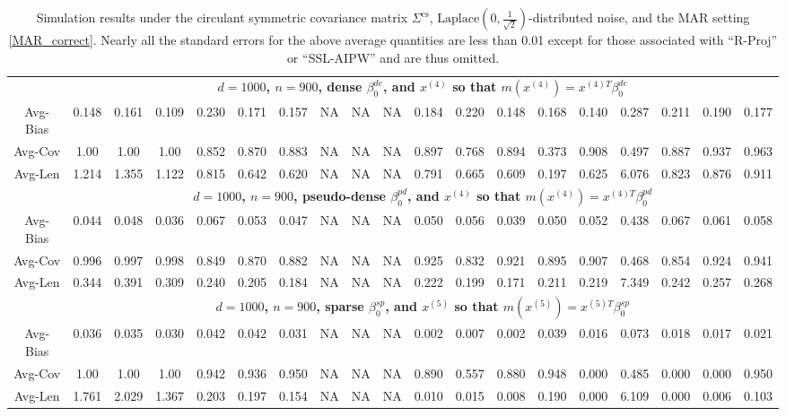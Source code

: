 \documentclass[ejsv2,noshowframe]{imsart}
\theoremstyle{plain}
\theoremstyle{definition}
\theoremstyle{remark}
\begin{document}
\begin{table}[hbtp!]
\begin{center}
{\begin{tabular}{ccccccccccccccccccc}
		& \multicolumn{18}{c}{\bf $d=1000$, $n = 900$, dense $\beta_0^{de}$, and $x^{(4)}$ so that $m(x^{(4)})=x^{(4)T}\beta_0^{de}$} \\ \cline{2-19}
		Avg-Bias & 0.148 & 0.161 & 0.109 & 0.230 & 0.171 & 0.157 & NA & NA & NA & 0.184 & 0.220 & 0.148 & 0.168 & 0.140 & 0.287 & 0.211 & 0.190 & 0.177 \\
		Avg-Cov & 1.00 & 1.00 & 1.00 & 0.852 & 0.870 & 0.883 & NA & NA & NA & 0.897 & 0.768 & 0.894 & 0.373 & 0.908 & 0.497 & 0.887 & 0.937 & 0.963 \\
		Avg-Len & 1.214 & 1.355 & 1.122 & 0.815 & 0.642 & 0.620 & NA & NA & NA & 0.791 & 0.665 & 0.609 & 0.197 & 0.625 & 6.076 & 0.823 & 0.876 & 0.911 \\
		\cline{2-19}
		
		& \multicolumn{18}{c}{\bf $d=1000$, $n = 900$, pseudo-dense $\beta_0^{pd}$, and $x^{(4)}$ so that $m(x^{(4)})=x^{(4)T}\beta_0^{pd}$} \\ \cline{2-19}
		Avg-Bias & 0.044 & 0.048 & 0.036 & 0.067 & 0.053 & 0.047 & NA & NA & NA & 0.050 & 0.056 & 0.039 & 0.050 & 0.052 & 0.438 & 0.067 & 0.061 & 0.058 \\
		Avg-Cov & 0.996 & 0.997 & 0.998 & 0.849 & 0.870 & 0.882 & NA & NA & NA & 0.925 & 0.832 & 0.921 & 0.895 & 0.907 & 0.468 & 0.854 & 0.924 & 0.941 \\
		Avg-Len & 0.344 & 0.391 & 0.309 & 0.240 & 0.205 & 0.184 & NA & NA & NA & 0.222 & 0.199 & 0.171 & 0.211 & 0.219 & 7.349 & 0.242 & 0.257 & 0.268 \\
		\hline
		
		& \multicolumn{18}{c}{\bf $d=1000$, $n = 900$, sparse $\beta_0^{sp}$, and $x^{(5)}$ so that $m(x^{(5)})=x^{(5)T}\beta_0^{sp}$} \\ \cline{2-19}
		Avg-Bias & 0.036 & 0.035 & 0.030 & 0.042 & 0.042 & 0.031 & NA & NA & NA & 0.002 & 0.007 & 0.002 & 0.039 & 0.016 & 0.073 & 0.018 & 0.017 & 0.021 \\
		Avg-Cov & 1.00 & 1.00 & 1.00 & 0.942 & 0.936 & 0.950 & NA & NA & NA & 0.890 & 0.557 & 0.880 & 0.948 & 0.000 & 0.485 & 0.000 & 0.000 & 0.950 \\
		Avg-Len & 1.761 & 2.029 & 1.367 & 0.203 & 0.197 & 0.154 & NA & NA & NA & 0.010 & 0.015 & 0.008 & 0.190 & 0.000 & 6.109 & 0.000 & 0.006 & 0.103 \\
		\hline\hline
\end{tabular}}
\caption{Simulation results under the circulant symmetric covariance matrix $\Sigma^{\mathrm{cs}}$, $\mathrm{Laplace}\left(0, \frac{1}{\sqrt{2}} \right)$-distributed noise, and the MAR setting \eqref{MAR_correct}. Nearly all the standard errors for the above average quantities are less than 0.01 except for those associated with ``R-Proj'' or ``SSL-AIPW'' and are thus omitted.}
\label{table:cirsym_MAR_laperr_res}
\end{center}
\end{table}
\end{document}

